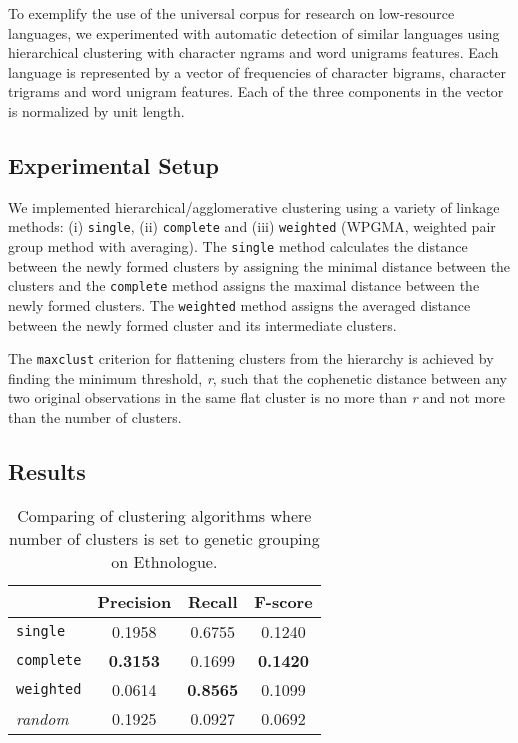 \documentclass[11pt]{article}
\begin{document}
To exemplify the use of the universal corpus for research on low-resource languages, we experimented with automatic detection of similar languages using hierarchical clustering with character ngrams and word unigrams features. Each language is represented by a vector of frequencies of  character bigrams, character trigrams and word unigram features. Each of the three components in the vector is normalized by unit length.


\subsection{Experimental Setup}
We implemented hierarchical/agglomerative clustering using a variety of linkage methods: (i) \texttt{single}, (ii) \texttt{complete} and (iii) \texttt{weighted} (WPGMA, weighted pair group method with averaging). The \texttt{single} method calculates the distance between the newly formed clusters by assigning the minimal distance between the clusters and the \texttt{complete} method assigns the maximal distance between the newly formed clusters. The \texttt{weighted} method assigns the averaged distance between the newly formed cluster and its intermediate clusters. 

The \texttt{maxclust} criterion for flattening clusters from the hierarchy is achieved by finding the minimum threshold, \emph{r}, such that the cophenetic distance between any two original observations in the same flat cluster is no more than \emph{r} and not more than the number of clusters.

\newpage
\subsection{Results}
\begin{table*}[h!]
\begin{centering}

    \begin{tabular}{l|ccc}
    ~        & Precision & Recall       & F-score    \\ \hline
    \texttt{single} & 0.1958	& 0.6755	 & 0.1240  \\
	\texttt{complete} & \textbf{0.3153}	& 0.1699	 & \textbf{0.1420} \\
	\texttt{weighted} & 0.0614	& \textbf{0.8565}	 & 0.1099 \\ \hline
	\emph{random} & 0.1925 &	0.0927 & 	0.0692 \\
    \end{tabular}
\caption{Comparing of clustering algorithms where number of clusters is set to genetic grouping on Ethnologue.}
\end{centering}
\label{tab:cluster}
\end{table*}
\end{document}
